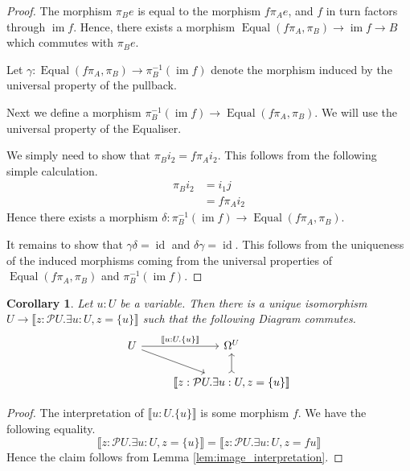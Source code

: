 \documentclass{birkjour}
\theoremstyle{plain}
\newtheorem{corollary}[thm]{Corollary}
\theoremstyle{definition}
\newcommand{\call}[1]{\mathcal{#1}}
\newcommand{\lto}{\longrightarrow}
\begin{document}
\begin{proof}
		The morphism $\pi_B e$ is equal to the morphism $f\pi_Ae$, and $f$ in turn factors through $\operatorname{im}f$. Hence, there exists a morphism $\operatorname{Equal}(f\pi_A,\pi_B) \lto \operatorname{im}f \lto B$ which commutes with $\pi_B e$.
		
		Let $\gamma: \operatorname{Equal}(f\pi_A,\pi_B) \lto \pi_B^{-1}(\operatorname{im}f)$ denote the morphism induced by the universal property of the pullback.
		
		Next we define a morphism $\pi_B^{-1}(\operatorname{im}f) \lto \operatorname{Equal}(f\pi_A,\pi_B)$. We will use the universal property of the Equaliser.
		
		We simply need to show that $\pi_Bi_2 = f\pi_Ai_2$.  This follows from the following simple calculation.
		\begin{align*}
			\pi_B i_2 &= i_1 j\\
			&= f\pi_Ai_2
		\end{align*}
		Hence there exists a morphism $\delta: \pi_B^{-1}(\operatorname{im}f) \lto \operatorname{Equal}(f\pi_A,\pi_B)$.
		
		It remains to show that $\gamma \delta = \operatorname{id}$ and $\delta \gamma = \operatorname{id}$. This follows from the uniqueness of the induced morphisms coming from the universal properties of $\operatorname{Equal}(f\pi_A,\pi_B)$ and $\pi_B^{-1}(\operatorname{im}f)$.
	\end{proof}
	\begin{corollary}\label{cor:embedded_subobject}
		Let $u:U$ be a variable. Then there is a unique isomorphism $U \lto \llbracket z: \call{P}U. \exists u:U, z = \lbrace u \rbrace \rrbracket$ such that the following Diagram commutes.
		\begin{equation}
			\begin{tikzcd}
				U\arrow[r,"{\llbracket u:U. \lbrace u \rbrace \rrbracket}"]\arrow[dr] & \Omega^U\\
				& \llbracket z: \call{P}U . \exists u :U, z = \lbrace u \rbrace \rrbracket\arrow[u,rightarrowtail]
			\end{tikzcd}
		\end{equation}
	\end{corollary}
	\begin{proof}
		The interpretation of $\llbracket u:U. \lbrace u \rbrace \rrbracket$ is some morphism $f$. We have the following equality.
		\begin{equation}
			\llbracket z: \call{P}U. \exists u:U, z = \lbrace u \rbrace \rrbracket = \llbracket z : \call{P}U. \exists u : U, z = fu\rrbracket
		\end{equation}
		Hence the claim follows from Lemma \ref{lem:image_interpretation}.
	\end{proof}
\end{document}
